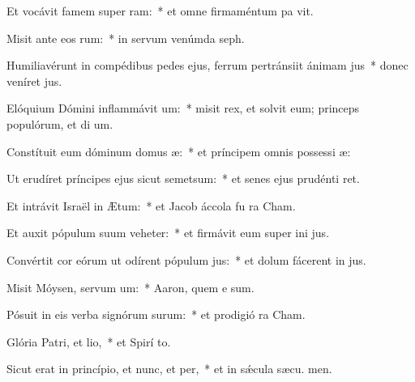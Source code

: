 \item Et vocávit famem super ram:~* et omne firmaméntum pa vit.
\item Misit ante eos rum:~* in servum venúmda  seph.
\item Humiliavérunt in compédibus pedes ejus, ferrum pertránsiit ánimam jus~* donec veníret  jus.
\item Elóquium Dómini inflammávit um:~* misit rex, et solvit eum; princeps populórum, et di um.
\item Constítuit eum dóminum domus æ:~* et príncipem omnis possessi æ:
\item Ut erudíret príncipes ejus sicut semetsum:~* et senes ejus prudénti ret.
\item Et intrávit Israël in Ætum:~* et Jacob áccola fu  ra Cham.
\item Et auxit pópulum suum veheter:~* et firmávit eum super ini jus.
\item Convértit cor eórum ut odírent pópulum jus:~* et dolum fácerent in  jus.
\item Misit Móysen, servum um:~* Aaron, quem e sum.
\item Pósuit in eis verba signórum surum:~* et prodigió  ra Cham.
\item Glória Patri, et lio,~* et Spirí to.
\item Sicut erat in princípio, et nunc, et per,~* et in sǽcula sæcu. men.
